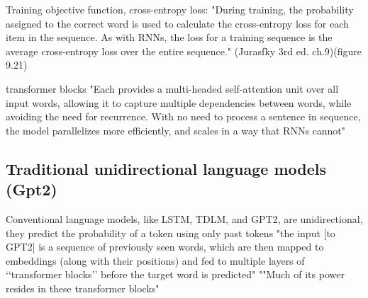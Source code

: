 






Training objective function, cross-entropy loss:
 "During training, the probability assigned to the correct word is used to calculate the cross-entropy loss for each item in the sequence. As with RNNs, the loss for a training sequence is the average cross-entropy loss over the entire sequence." (Jurasfky 3rd ed. ch.9)(figure 9.21)


transformer blocks "Each provides a multi-headed self-attention unit over all input words, allowing it to capture multiple dependencies between words, while avoiding the need for recurrence. With no need to process a sentence in sequence, the model parallelizes more efficiently, and scales in a way that RNNs cannot" \citep{lau2020furiously}


\subsection{Traditional unidirectional language models (Gpt2)}



Conventional language models, like LSTM, TDLM, and GPT2, are unidirectional, they predict the probability of a token using only past tokens
"the input [to GPT2] is a sequence of previously seen words, which are then mapped to embeddings (along with their positions) and fed to multiple layers of ‘‘transformer blocks’’ before the target word is predicted" ""Much of its power resides in these transformer blocks" \citep{lau2020furiously}


